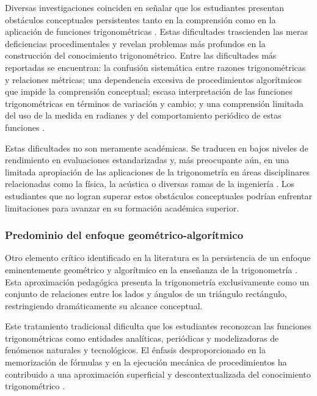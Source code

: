 Diversas investigaciones coinciden en señalar que los estudiantes presentan obstáculos conceptuales persistentes tanto en la comprensión como en la aplicación de funciones trigonométricas . Estas dificultades trascienden las meras deficiencias procedimentales y revelan problemas más profundos en la construcción del conocimiento trigonométrico. Entre las dificultades más reportadas se encuentran: la confusión sistemática entre razones trigonométricas y relaciones métricas; una dependencia excesiva de procedimientos algorítmicos que impide la comprensión conceptual; escasa interpretación de las funciones trigonométricas en términos de variación y cambio; y una comprensión limitada del uso de la medida en radianes y del comportamiento periódico de estas funciones \parencite{delgadoEstrategiaDidacticaPara2023,iriarteDificultadesAprendizajeEcuaciones2025,chaconComprensionRazonesTrigonometricas2007}.

Estas dificultades no son meramente académicas. Se traducen en bajos niveles de rendimiento en evaluaciones estandarizadas y, más preocupante aún, en una limitada apropiación de las aplicaciones de la trigonometría en áreas disciplinares relacionadas como la física, la acústica o diversas ramas de la ingeniería \parencite{andradeSuperficialidadEnsenanzaTrigonometria2020}. Los estudiantes que no logran superar estos obstáculos conceptuales podrían enfrentar limitaciones para avanzar en su formación académica superior.

\subsubsection{Predominio del enfoque geométrico-algorítmico}

Otro elemento crítico identificado en la literatura es la persistencia de un enfoque eminentemente geométrico y algorítmico en la enseñanza de la trigonometría \parencite{magatFunctionalApproachTeaching2018,rosaEnsenanzaAprendizajeTrigonometria2023}. Esta aproximación pedagógica presenta la trigonometría exclusivamente como un conjunto de relaciones entre los lados y ángulos de un triángulo rectángulo, restringiendo dramáticamente su alcance conceptual.

Este tratamiento tradicional dificulta que los estudiantes reconozcan las funciones trigonométricas como entidades analíticas, periódicas y modelizadoras de fenómenos naturales y tecnológicos. El énfasis desproporcionado en la memorización de fórmulas y en la ejecución mecánica de procedimientos ha contribuido a una aproximación superficial y descontextualizada del conocimiento trigonométrico 
\parencite{nguDifferentialInstructionalEffectiveness2023}.

